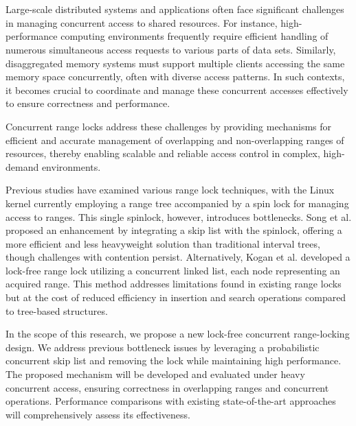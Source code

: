 \chapter{\abstractname}

Large-scale distributed systems and applications often face significant challenges in managing concurrent access to shared resources. For instance, high-performance computing environments frequently require efficient handling of numerous simultaneous access requests to various parts of data sets. Similarly, disaggregated memory systems must support multiple clients accessing the same memory space concurrently, often with diverse access patterns. In such contexts, it becomes crucial to coordinate and manage these concurrent accesses effectively to ensure correctness and performance. 

Concurrent range locks address these challenges by providing mechanisms for efficient and accurate management of overlapping and non-overlapping ranges of resources, thereby enabling scalable and reliable access control in complex, high-demand environments.

Previous studies have examined various range lock techniques, with the Linux kernel currently employing a range tree accompanied by a spin lock for managing access to ranges. This single spinlock, however, introduces bottlenecks. Song et al. proposed an enhancement by integrating a skip list with the spinlock, offering a more efficient and less heavyweight solution than traditional interval trees, though challenges with contention persist. Alternatively, Kogan et al. developed a lock-free range lock utilizing a concurrent linked list, each node representing an acquired range. This method addresses limitations found in existing range locks but at the cost of reduced efficiency in insertion and search operations compared to tree-based structures.

In the scope of this research, we propose a new lock-free concurrent range-locking design. We address previous bottleneck issues by leveraging a probabilistic concurrent skip list and removing the lock while maintaining high performance. The proposed mechanism will be developed and evaluated under heavy concurrent access, ensuring correctness in overlapping ranges and concurrent operations. Performance comparisons with existing state-of-the-art approaches will comprehensively assess its effectiveness.

